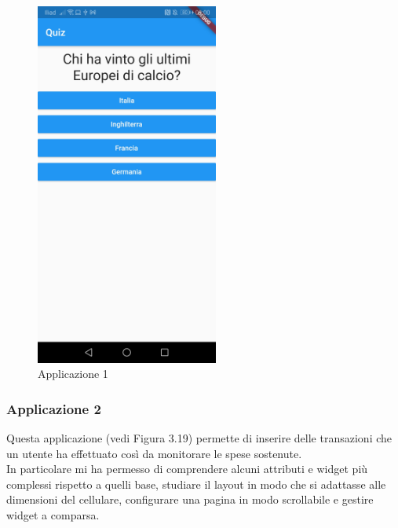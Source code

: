 \begin{figure}[htbp]	
	\centering
	\includegraphics[width=6cm]{immagini/app1.jpeg}
	\caption{Applicazione 1}
	\label{fig:Applicazione 1}
\end{figure}

\newpage

\subsubsection{Applicazione 2}
Questa applicazione (vedi Figura 3.19) permette di inserire delle transazioni che un utente ha effettuato così da monitorare le spese sostenute.\\
In particolare mi ha permesso di comprendere alcuni attributi e widget più complessi rispetto a quelli base, studiare il layout in modo che si adattasse alle dimensioni del cellulare, configurare una pagina in modo scrollabile e gestire widget a comparsa.\\

